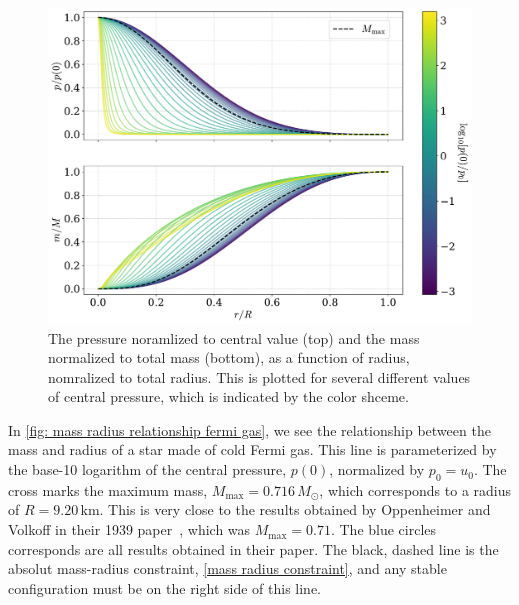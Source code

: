 \begin{figure}
    \centering
    \includegraphics[width=\textwidth]{../scripts/figurer/pressure_mass.pdf}
    \caption{The pressure noramlized to central value (top) and the mass normalized to total mass (bottom), as a function of radius, nomralized to total radius. This is plotted for several different values of central pressure, which is indicated by the color shceme.}
    \label{fig: pressure and mass as a fucntion of radius}
\end{figure}


In \autoref{fig: mass radius relationship fermi gas}, we see the relationship between the mass and radius of a star made of cold Fermi gas.
This line is parameterized by the base-10 logarithm of the central pressure, $p(0)$, normalized by $p_0 = u_0$.
The cross marks the maximum mass, $M_\mathrm{max} = 0.716 \, M_\odot$, which corresponds to a radius of $R = 9.20 \, \mathrm{km}$.
This is very close to the results obtained by Oppenheimer and Volkoff in their 1939 paper~\cite{oppenheimerMassiveNeutronCores1939}, which was $M_\mathrm{max} = 0.71$.
The blue circles corresponds are all results obtained in their paper.
The black, dashed line is the absolut mass-radius constraint, \autoref{mass radius constraint}, and any stable configuration must be on the right side of this line.


